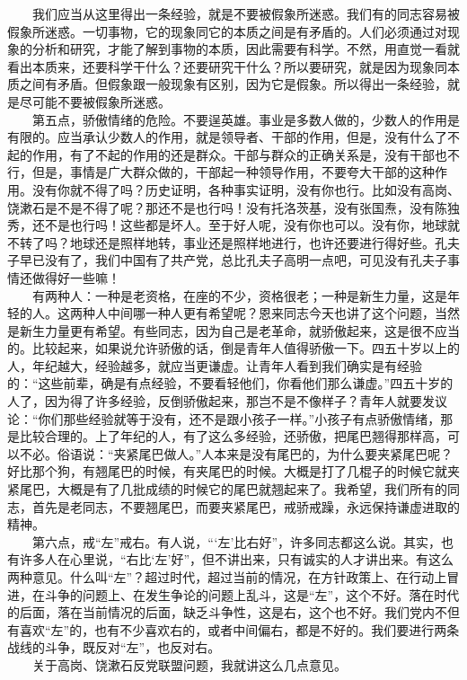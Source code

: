 \documentclass[cn,11pt,chinese]{elegantbook}
\begin{document}
　　我们应当从这里得出一条经验，就是不要被假象所迷惑。我们有的同志容易被假象所迷惑。一切事物，它的现象同它的本质之间是有矛盾的。人们必须通过对现象的分析和研究，才能了解到事物的本质，因此需要有科学。不然，用直觉一看就看出本质来，还要科学干什么？还要研究干什么？所以要研究，就是因为现象同本质之间有矛盾。但假象跟一般现象有区别，因为它是假象。所以得出一条经验，就是尽可能不要被假象所迷惑。\\
　　第五点，骄傲情绪的危险。不要逞英雄。事业是多数人做的，少数人的作用是有限的。应当承认少数人的作用，就是领导者、干部的作用，但是，没有什么了不起的作用，有了不起的作用的还是群众。干部与群众的正确关系是，没有干部也不行，但是，事情是广大群众做的，干部起一种领导作用，不要夸大干部的这种作用。没有你就不得了吗？历史证明，各种事实证明，没有你也行。比如没有高岗、饶漱石是不是不得了呢？那还不是也行吗！没有托洛茨基，没有张国焘，没有陈独秀，还不是也行吗！这些都是坏人。至于好人呢，没有你也可以。没有你，地球就不转了吗？地球还是照样地转，事业还是照样地进行，也许还要进行得好些。孔夫子早已没有了，我们中国有了共产党，总比孔夫子高明一点吧，可见没有孔夫子事情还做得好一些嘛！\\
　　有两种人：一种是老资格，在座的不少，资格很老；一种是新生力量，这是年轻的人。这两种人中间哪一种人更有希望呢？恩来同志今天也讲了这个问题，当然是新生力量更有希望。有些同志，因为自己是老革命，就骄傲起来，这是很不应当的。比较起来，如果说允许骄傲的话，倒是青年人值得骄傲一下。四五十岁以上的人，年纪越大，经验越多，就应当更谦虚。让青年人看到我们确实是有经验的：“这些前辈，确是有点经验，不要看轻他们，你看他们那么谦虚。”四五十岁的人了，因为得了许多经验，反倒骄傲起来，那岂不是不像样子？青年人就要发议论：“你们那些经验就等于没有，还不是跟小孩子一样。”小孩子有点骄傲情绪，那是比较合理的。上了年纪的人，有了这么多经验，还骄傲，把尾巴翘得那样高，可以不必。俗语说：“夹紧尾巴做人。”人本来是没有尾巴的，为什么要夹紧尾巴呢？好比那个狗，有翘尾巴的时候，有夹尾巴的时候。大概是打了几棍子的时候它就夹紧尾巴，大概是有了几批成绩的时候它的尾巴就翘起来了。我希望，我们所有的同志，首先是老同志，不要翘尾巴，而要夹紧尾巴，戒骄戒躁，永远保持谦虚进取的精神。\\
　　第六点，戒“左”戒右。有人说，“‘左’比右好”，许多同志都这么说。其实，也有许多人在心里说，“右比‘左’好”，但不讲出来，只有诚实的人才讲出来。有这么两种意见。什么叫“左”？超过时代，超过当前的情况，在方针政策上、在行动上冒进，在斗争的问题上、在发生争论的问题上乱斗，这是“左”，这个不好。落在时代的后面，落在当前情况的后面，缺乏斗争性，这是右，这个也不好。我们党内不但有喜欢“左”的，也有不少喜欢右的，或者中间偏右，都是不好的。我们要进行两条战线的斗争，既反对“左”，也反对右。\\
　　关于高岗、饶漱石反党联盟问题，我就讲这么几点意见。\\
\end{document}
